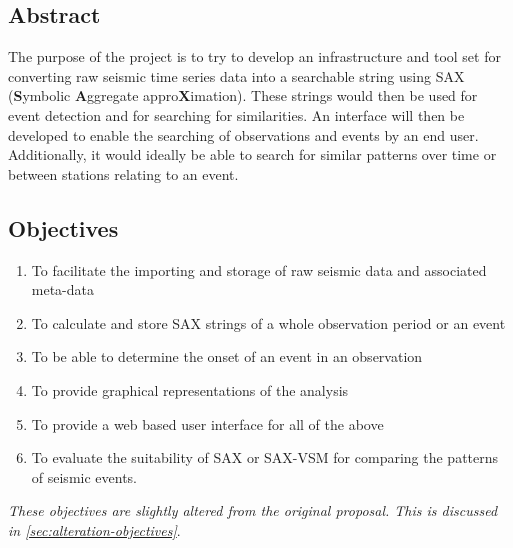 \documentclass[../report.tex]{subfiles}
\begin{document}
\subsection*{Abstract}
%
%	
	The purpose of the project is to try to develop an infrastructure and tool set for converting raw seismic time series data into a searchable string using SAX (\textbf{S}ymbolic \textbf{A}ggregate appro\textbf{X}imation).  These strings would then be used for event detection and for searching for similarities. An interface will then be developed to enable the searching of observations and events by an end user.  Additionally, it would ideally be able to search for similar patterns over time or between stations relating to an event.
	
\subsection*{Objectives} \label{sec:objectives}
	\begin{enumerate}
		\item To facilitate the importing and storage of raw seismic data and associated meta-data
		\item To calculate and store SAX strings of a whole observation period or an event
		\item To be able to determine the onset of an event in an observation
		\item To provide graphical representations of the analysis
		\item To provide a web based user interface for all of the above
		\item To evaluate the suitability of SAX or SAX-VSM for comparing the patterns of seismic events.
	\end{enumerate}

	\textit{These objectives are slightly altered from the original proposal.  This is discussed in \cref{sec:alteration-objectives}}.
		
\end{document}
